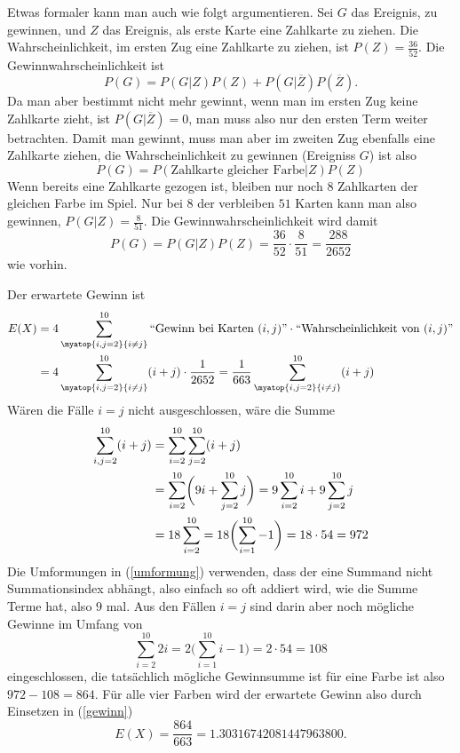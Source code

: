 \begin{loesung}
\begin{teilaufgaben}
Etwas formaler kann man auch wie folgt argumentieren.
Sei $G$ das Ereignis, zu gewinnen, und $Z$ das Ereignis, als erste
Karte eine Zahlkarte zu ziehen.
Die Wahrscheinlichkeit,
im ersten Zug eine Zahlkarte zu ziehen, ist $P(Z)=\frac{36}{52}$.
Die Gewinnwahrscheinlichkeit ist
\[
P(G)=
P(G|Z)P(Z)
+P(G|\overline{Z})P(\overline{Z}).
\]
Da man aber bestimmt nicht mehr gewinnt, wenn man im ersten Zug
keine Zahlkarte zieht, ist $P(G|\overline{Z})=0$, man muss
also nur den ersten Term weiter betrachten.
Damit man
gewinnt, muss man aber im zweiten Zug ebenfalls eine Zahlkarte ziehen,
die Wahrscheinlichkeit zu gewinnen (Ereigniss $G$) ist also
\[
P(G)=P(\text{Zahlkarte gleicher Farbe}|Z)P(Z)
\]
Wenn bereits eine Zahlkarte gezogen ist, bleiben nur noch $8$
Zahlkarten der gleichen Farbe im Spiel. Nur bei $8$ der
verbleiben $51$ Karten kann man also gewinnen, $P(G|Z)=\frac{8}{51}$.
Die Gewinnwahrscheinlichkeit wird damit
\[
P(G)=
P(G|Z)P(Z)
=\frac{36}{52}\cdot\frac{8}{51}= \frac{288}{2652}
\]
wie vorhin.
\item
Der erwartete Gewinn ist
\begin{align}
E(X)&=4\sum_{\myatop{i,j=2}{i \ne j}}^{10} \text{``Gewinn bei Karten $(i,j)$''}
\cdot\text{``Wahrscheinlichkeit von $(i,j)$''}
\notag
\\
&=
4\sum_{\myatop{i,j=2}{i\ne j}}^{10}(i+j)\cdot\frac1{2652}
=
\frac{1}{663}\sum_{\myatop{i,j=2}{i\ne j}}^{10}(i+j)
\label{gewinn}
\end{align}
Wären die Fälle $i=j$ nicht ausgeschlossen, wäre die Summe
\begin{align}
\sum_{i,j=2}^{10}(i+j)
&=
\sum_{i=2}^{10}\sum_{j=2}^{10}(i+j)
\notag
\\
&=
\sum_{i=2}^{10}\biggl(9i + \sum_{j=2}^{10}j\biggr)
=
9\sum_{i=2}^{10}i +9\sum_{j=2}^{10}j
\label{umformung}
\\
&=
18 \sum_{i=2}^{10}
\notag
=
18 \biggl(\sum_{i=1}^{10}-1\biggr)
=18\cdot 54= 972
\notag
\end{align}
Die Umformungen in (\ref{umformung}) verwenden, dass der eine
Summand nicht Summationsindex abhängt, also einfach so oft
addiert wird, wie die Summe Terme hat, also $9$ mal.
Aus den Fällen $i=j$ sind darin aber noch
mögliche Gewinne im Umfang von
\[
\sum_{i=2}^{10}2i=2\biggl(\sum_{i=1}^{10}i-1\biggr)=2\cdot 54=108
\]
eingeschlossen, die tatsächlich mögliche Gewinnsumme ist
für eine Farbe ist also $972-108=864$. Für alle vier Farben
wird der erwartete Gewinn also durch Einsetzen in (\ref{gewinn})
\[
E(X)=\frac{864}{663}=
1.30316742081447963800
.
\]


\end{teilaufgaben}
\end{loesung}
